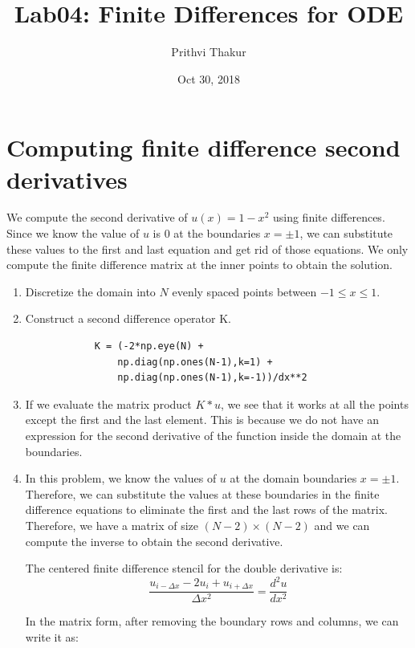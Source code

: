 \documentclass{article}
\title{Lab04: Finite Differences for ODE}
\author{Prithvi Thakur}
\date{Oct 30, 2018}
\begin{document}
\maketitle

\section{Computing finite difference second derivatives}
We compute the second derivative of $u(x) = 1 - x^2$ using finite differences. Since we know the value of $u$ is $0$ at the boundaries $x = \pm 1$, we can substitute these values to the first and last equation and get rid of those equations. We only compute the finite difference matrix at the inner points to obtain the solution.

\renewcommand{\theenumi}{\alph{enumi}}
\begin{enumerate}

    \item Discretize the domain into $N$ evenly spaced points between $-1\le x\le 1$.

    \item Construct a second difference operator K.
        \begin{verbatim}
            K = (-2*np.eye(N) + 
                np.diag(np.ones(N-1),k=1) + 
                np.diag(np.ones(N-1),k=-1))/dx**2
        \end{verbatim}

    \item If we evaluate the matrix product $K*u$, we see that it works at all the points except the first and the last element. This is because we do not have an expression for the second derivative of the function inside the domain at the boundaries.

    \item In this problem, we know the values of $u$ at the domain boundaries $x = \pm 1$. Therefore, we can substitute the values at these boundaries in the finite difference equations to eliminate the first and the last rows of the matrix. Therefore, we have a matrix of size $(N-2)\times(N-2)$ and we can compute the inverse to obtain the second derivative. 

    The centered finite difference stencil for the double derivative is:
    $$
    \frac{u_{i-\Delta x} - 2u_i + u_{i+\Delta x}}{\Delta x^2} = \frac{d^2u}{dx^2}
    $$
    
    In the matrix form, after removing the boundary rows and columns, we can write it as:
    

\end{enumerate}
\end{document}
